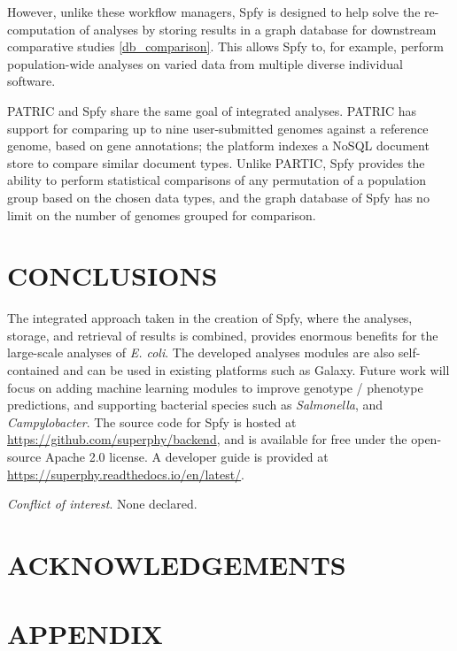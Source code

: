 \documentclass{article}
\begin{document}
However, unlike these workflow managers, Spfy is designed to help solve the re-computation of analyses by storing results in a graph database for downstream comparative studies \ref{db_comparison}. This allows Spfy to, for example, perform population-wide analyses on varied data from multiple diverse individual software.

\small 

PATRIC \cite{wattam2016improvements} and Spfy share the same goal of integrated analyses. PATRIC has support for comparing up to nine user-submitted genomes against a reference genome, based on gene annotations; the platform indexes a NoSQL document store to compare similar document types. Unlike PARTIC, Spfy provides the ability to perform statistical comparisons of any permutation of a population group based on the chosen data types, and the graph database of Spfy has no limit on the number of genomes grouped for comparison.

\section{CONCLUSIONS}

The integrated approach taken in the creation of Spfy, where the analyses, storage, and retrieval of results is combined, provides enormous benefits for the large-scale analyses of \textit{E. coli}. The developed analyses modules are also self-contained and can be used in existing platforms such as Galaxy. Future work will focus on adding machine learning modules to improve genotype / phenotype predictions, and supporting bacterial species such as \textit{Salmonella}, and \textit{Campylobacter}. The source code for Spfy is hosted at \url{https://github.com/superphy/backend}, and is available for free under the open-source Apache 2.0 license. A developer guide is provided at \url{https://superphy.readthedocs.io/en/latest/}.

\textit{Conflict of interest}. None declared.

\section{ACKNOWLEDGEMENTS}

\newpage




\newpage

\section{APPENDIX}
\end{document}
